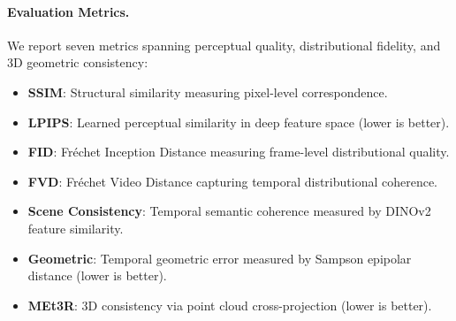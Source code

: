 \begin{table}[t]
	\centering
	\caption{Text-conditioned multi-view generation results on the AgiBot-World benchmark. Best results are in \textbf{bold}, second best are \underline{underlined}. $\uparrow$ indicates higher is better, $\downarrow$ indicates lower is better.}
	\label{tab:text-cond}
	\renewcommand{\arraystretch}{1.15}
\end{table}

\paragraph{Evaluation Metrics.}
We report seven metrics spanning perceptual quality, distributional fidelity, and 3D geometric consistency:
\begin{itemize}[nosep]
	\item \textbf{SSIM}: Structural similarity measuring pixel-level correspondence.
	\item \textbf{LPIPS}: Learned perceptual similarity in deep feature space (lower is better).
	\item \textbf{FID}: Fr\'echet Inception Distance measuring frame-level distributional quality.
	\item \textbf{FVD}: Fr\'echet Video Distance capturing temporal distributional coherence.
	\item \textbf{Scene Consistency}: Temporal semantic coherence measured by DINOv2 feature similarity.
	\item \textbf{Geometric}: Temporal geometric error measured by Sampson epipolar distance (lower is better).
	\item \textbf{MEt3R}: 3D consistency via point cloud cross-projection (lower is better).
\end{itemize}

